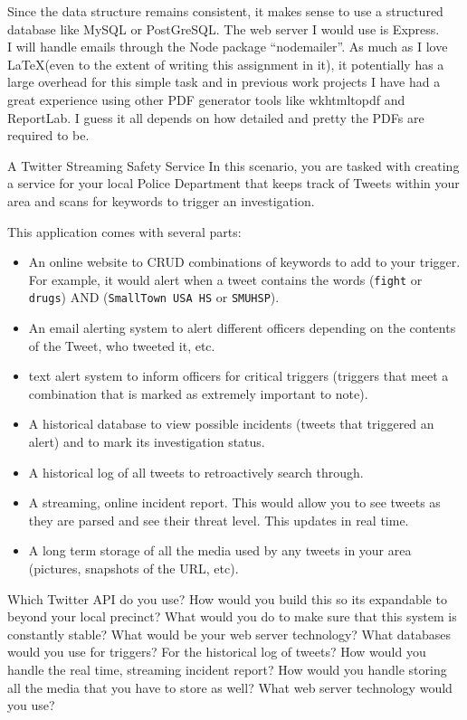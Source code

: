 \documentclass{homework}
\begin{document}
\begin{solution}
    Since the data structure remains consistent, it makes sense to use a structured database like MySQL or PostGreSQL. The web server I would use is Express.\\

    I will handle emails through the Node package ``nodemailer''. As much as I love \LaTeX (even to the extent of writing this assignment in it), it potentially has a large overhead for this simple task and in previous work projects I have had a great experience using other PDF generator tools like wkhtmltopdf and ReportLab. I guess it all depends on how detailed and pretty the PDFs are required to be. 

\end{solution}

\newpage
\begin{problem}[3]{A Twitter Streaming Safety Service}
    In this scenario, you are tasked with creating a service for your local Police Department that keeps track of Tweets within your area and scans for keywords to trigger an investigation.
    
    \vskip 1mm
   
    This application comes with several parts:
    \begin{itemize}
        \item An online website to CRUD combinations of keywords to add to your trigger. For example, it would alert when a tweet contains the words (\texttt{fight} or \texttt{drugs}) AND (\texttt{SmallTown USA HS} or \texttt{SMUHSP}).
        \item An email alerting system to alert different officers depending on the contents of the Tweet, who tweeted it, etc.
        \item text alert system to inform officers for critical triggers (triggers that meet a combination that is marked as extremely important to note).
        \item A historical database to view possible incidents (tweets that triggered an alert) and to mark its investigation status.
        \item A historical log of all tweets to retroactively search through.
        \item A streaming, online incident report. This would allow you to see tweets as they are parsed and see their threat level. This updates in real time.
        \item A long term storage of all the media used by any tweets in your area (pictures, snapshots of the URL, etc).
    \end{itemize}
    Which Twitter API do you use? How would you build this so its expandable to beyond your local precinct? What would you do to make sure that this system is constantly stable? What would be your web server technology? What databases would you use for triggers? For the historical log of tweets? How would you handle the real time, streaming incident report? How would you handle storing all the media that you have to store as well? What web server technology would you use?
\end{problem}
\end{document}
